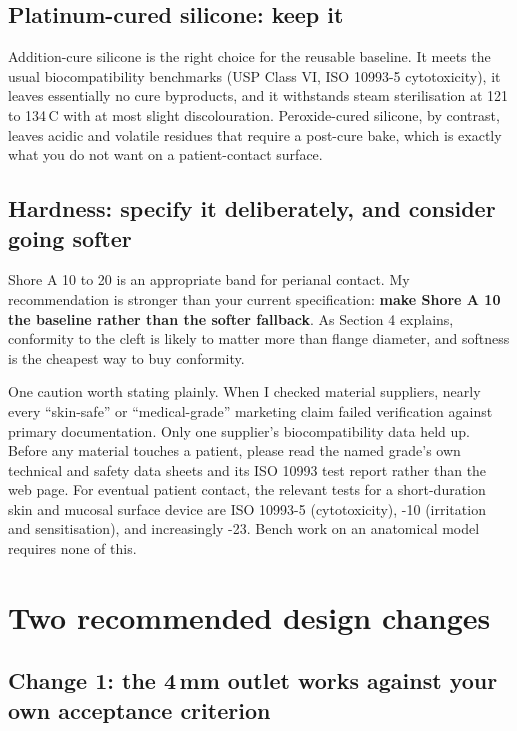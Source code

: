 \documentclass[11pt]{article}
\begin{document}
\subsection*{Platinum-cured silicone: keep it}

Addition-cure silicone is the right choice for the reusable baseline. It meets the usual biocompatibility benchmarks (USP Class VI, ISO 10993-5 cytotoxicity), it leaves essentially no cure byproducts, and it withstands steam sterilisation at 121 to 134\,\textdegree C with at most slight discolouration. Peroxide-cured silicone, by contrast, leaves acidic and volatile residues that require a post-cure bake, which is exactly what you do not want on a patient-contact surface.

\subsection*{Hardness: specify it deliberately, and consider going softer}

Shore A 10 to 20 is an appropriate band for perianal contact. My recommendation is stronger than your current specification: \textbf{make Shore A 10 the baseline rather than the softer fallback}. As Section 4 explains, conformity to the cleft is likely to matter more than flange diameter, and softness is the cheapest way to buy conformity.

One caution worth stating plainly. When I checked material suppliers, nearly every ``skin-safe'' or ``medical-grade'' marketing claim failed verification against primary documentation. Only one supplier's biocompatibility data held up. Before any material touches a patient, please read the named grade's own technical and safety data sheets and its ISO 10993 test report rather than the web page. For eventual patient contact, the relevant tests for a short-duration skin and mucosal surface device are ISO 10993-5 (cytotoxicity), -10 (irritation and sensitisation), and increasingly -23. Bench work on an anatomical model requires none of this.

\section{Two recommended design changes}

\subsection*{Change 1: the 4\,mm outlet works against your own acceptance criterion}
\end{document}
